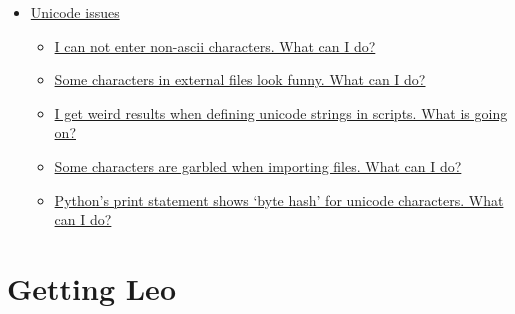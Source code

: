 \documentclass[a4paper,10pt,english]{sphinxmanual}
\begin{document}
{\begin{minipage}{0.95\linewidth}
\begin{itemize}
\begin{itemize}
\begin{itemize}
\item {} 
{\hyperref[FAQ:why-didn-t-leo-update-my-shadow-outline-as-expected]{Why didn't Leo update my @shadow outline as expected?}}

\item {} 
{\hyperref[FAQ:why-do-qt-windows-disappear-in-my-scripts]{Why do Qt windows disappear in my scripts?}}

\end{itemize}

\item {} 
{\hyperref[FAQ:unicode-issues]{Unicode issues}}
\begin{itemize}
\item {} 
{\hyperref[FAQ:i-can-not-enter-non-ascii-characters-what-can-i-do]{I can not enter non-ascii characters.  What can I do?}}

\item {} 
{\hyperref[FAQ:some-characters-in-external-files-look-funny-what-can-i-do]{Some characters in external files look funny. What can I do?}}

\item {} 
{\hyperref[FAQ:i-get-weird-results-when-defining-unicode-strings-in-scripts-what-is-going-on]{I get weird results when defining unicode strings in scripts.  What is going on?}}

\item {} 
{\hyperref[FAQ:some-characters-are-garbled-when-importing-files-what-can-i-do]{Some characters are garbled when importing files. What can I do?}}

\item {} 
{\hyperref[FAQ:python-s-print-statement-shows-byte-hash-for-unicode-characters-what-can-i-do]{Python's print statement shows `byte hash' for unicode characters.  What can I do?}}

\end{itemize}

\end{itemize}

\end{itemize}
\end{minipage}}
\begin{center}\setlength{\fboxsep}{5pt}\end{center}


\section{Getting Leo}
\label{FAQ:settings}\label{FAQ:getting-leo}
\end{document}

